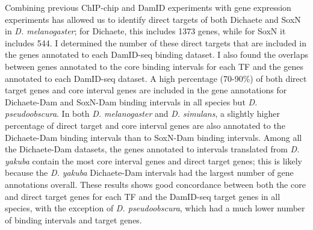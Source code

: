 Combining previous ChIP-chip and DamID experiments with gene expression experiments has allowed us to identify direct targets of both Dichaete and SoxN in \emph{D. melanogaster}; for Dichaete, this includes 1373 genes, while for SoxN it includes 544. I determined the number of these direct targets that are included in the genes annotated to each DamID-seq binding dataset. I also found the overlaps between genes annotated to the core binding intervals for each TF and the genes annotated to each DamID-seq dataset. A high percentage (70-90\%) of both direct target genes and core interval genes are included in the gene annotations for Dichaete-Dam and SoxN-Dam binding intervals in all species but \emph{D. pseudoobscura}. In both \emph{D. melanogaster} and \emph{D. simulans}, a slightly higher percentage of direct target and core interval genes are also annotated to the Dichaete-Dam binding intervals than to SoxN-Dam binding intervals. Among all the Dichaete-Dam datasets, the genes annotated to intervals translated from \emph{D. yakuba} contain the most core interval genes and direct target genes; this is likely because the \emph{D. yakuba} Dichaete-Dam intervals had the largest number of gene annotations overall. These results shows good concordance between both the core and direct target genes for each TF and the DamID-seq target genes in all species, with the exception of \emph{D. pseudoobscura}, which had a much lower number of binding intervals and target genes.\\


